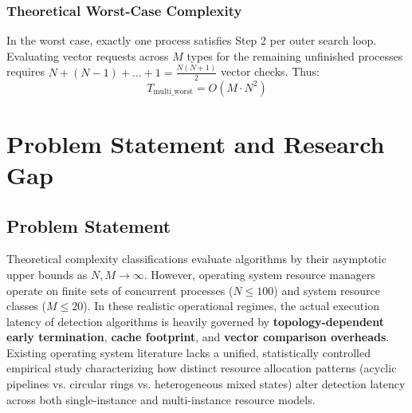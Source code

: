\documentclass[11pt,a4paper]{article}
\begin{document}
\subsubsection{Theoretical Worst-Case Complexity}
In the worst case, exactly one process satisfies Step 2 per outer search loop. Evaluating vector requests across $M$ types for the remaining unfinished processes requires $N + (N-1) + \dots + 1 = \frac{N(N+1)}{2}$ vector checks. Thus:
\begin{equation}
    T_{\text{multi\_worst}} = O(M \cdot N^2)
\end{equation}

\section{Problem Statement and Research Gap}

\subsection{Problem Statement}
Theoretical complexity classifications evaluate algorithms by their asymptotic upper bounds as $N, M \to \infty$. However, operating system resource managers operate on finite sets of concurrent processes ($N \le 100$) and system resource classes ($M \le 20$). In these realistic operational regimes, the actual execution latency of detection algorithms is heavily governed by \textbf{topology-dependent early termination}, \textbf{cache footprint}, and \textbf{vector comparison overheads}. Existing operating system literature lacks a unified, statistically controlled empirical study characterizing how distinct resource allocation patterns (acyclic pipelines vs. circular rings vs. heterogeneous mixed states) alter detection latency across both single-instance and multi-instance resource models.
\end{document}
